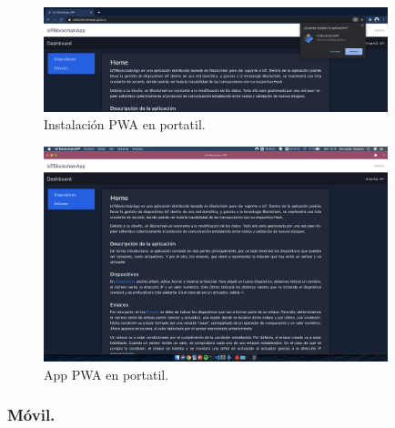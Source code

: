 \begin{figure}[ht!]
  \centering
  \includegraphics[width=10cm]{imagenes/desarrollo/web/pwa/instalacion_pwa_portatil}
  \caption{Instalación PWA en portatil.}
  \label{fig:instalacion-pwa-portatil}
\end{figure}

\begin{figure}[ht!]
  \centering
  \includegraphics[width=10cm]{imagenes/desarrollo/web/pwa/app_portatil}
  \caption{App PWA en portatil.}
  \label{fig:app-portatil}
\end{figure}

\subsubsection*{Móvil.}

